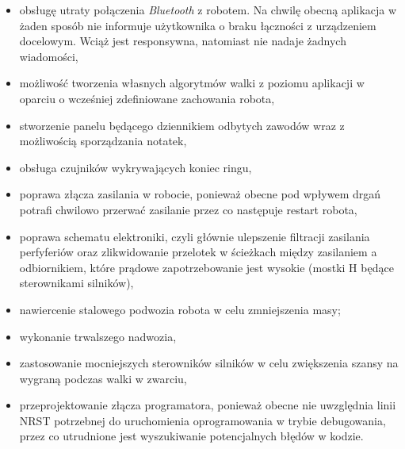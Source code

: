 \begin{itemize}
\item obsługę utraty połączenia \textit{Bluetooth} z robotem. Na chwilę obecną aplikacja w żaden sposób nie informuje użytkownika o braku łączności z urządzeniem docelowym. Wciąż jest responsywna, natomiast nie nadaje żadnych wiadomości,
\item możliwość tworzenia własnych algorytmów walki z poziomu aplikacji w oparciu o wcześniej zdefiniowane zachowania robota,
\item stworzenie panelu będącego dziennikiem odbytych zawodów wraz z możliwością sporządzania notatek,
\item obsługa czujników wykrywających koniec ringu,
\item poprawa złącza zasilania w robocie, ponieważ obecne pod wpływem drgań potrafi chwilowo przerwać zasilanie przez co następuje restart robota,
\item poprawa schematu elektroniki, czyli głównie ulepszenie filtracji zasilania perfyferiów oraz zlikwidowanie przelotek w ścieżkach między zasilaniem a odbiornikiem, które prądowe zapotrzebowanie jest wysokie (mostki H będące sterownikami silników),
\item nawiercenie stalowego podwozia robota w celu zmniejszenia masy;
\item wykonanie trwalszego nadwozia,
\item zastosowanie mocniejszych sterowników silników w celu zwiększenia szansy na wygraną podczas walki w zwarciu,
\item przeprojektowanie złącza programatora, ponieważ obecne nie uwzględnia linii NRST potrzebnej do uruchomienia oprogramowania w trybie debugowania, przez co utrudnione jest wyszukiwanie potencjalnych błędów w kodzie. 
\end{itemize}

